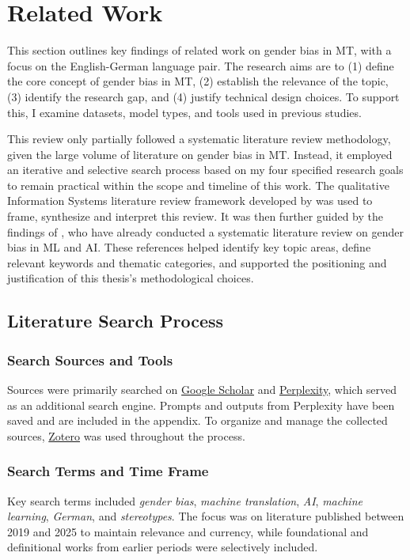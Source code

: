 \chapter{Related Work}

This section outlines key findings of related work on gender bias in MT, with a focus on the English-German language pair. The research aims are to (1) define the core concept of gender bias in MT, (2) establish the relevance of the topic, (3) identify the research gap, and (4) justify technical design choices. To support this, I examine datasets, model types, and tools used in previous studies.

This review only partially followed a systematic literature review methodology, given the large volume of literature on gender bias in MT. Instead, it employed an iterative and selective search process based on my four specified research goals to remain practical within the scope and timeline of this work. The qualitative Information Systems literature review framework developed by \citet{schryenWritingQualitativeLiterature2015} was used to frame, synthesize and interpret this review. It was then further guided by the findings of \citet{shresthaExploringGenderBiases2022}, who have already conducted a systematic literature review on gender bias in ML and AI. These references helped identify key topic areas, define relevant keywords and thematic categories, and supported the positioning and justification of this thesis’s methodological choices.

\section{Literature Search Process}

\subsection{Search Sources and Tools}
Sources were primarily searched on \href{https://scholar.google.com/}{Google Scholar} and \href{https://www.perplexity.ai/}{Perplexity}, which served as an additional search engine. Prompts and outputs from Perplexity have been saved and are included in the appendix. To organize and manage the collected sources, \href{https://www.zotero.org/}{Zotero} was used throughout the process.

\subsection{Search Terms and Time Frame}
Key search terms included \textit{gender bias}, \textit{machine translation}, \textit{AI}, \textit{machine learning}, \textit{German}, and \textit{stereotypes}. The focus was on literature published between 2019 and 2025 to maintain relevance and currency, while foundational and definitional works from earlier periods were selectively included.

